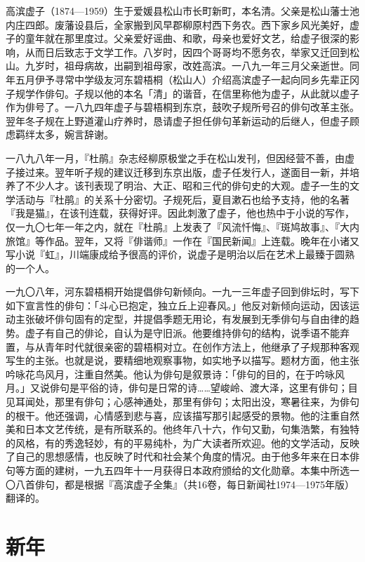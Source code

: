 {\FS
    高滨虚子（1874—1959）生于爱媛县松山市长町新町，本名清。父亲是松山藩士池内庄四郎。废藩设县后，全家搬到风早郡柳原村西下务农。西下家乡风光美好，虚子的童年就在那里度过。父亲爱好谣曲、和歌，母亲也爱好文艺，给虚子很深的影响，从而日后致志于文学工作。八岁时，因四个哥哥均不愿务农，举家又迁回到松山。九岁时，祖母病故，出嗣到祖母家，改姓高滨。一八九一年三月父亲逝世。同年五月伊予寻常中学级友河东碧梧桐（松山人）介绍高滨虚子一起向同乡先辈正冈子规学作俳句。子规以他的本名「清」的谐音，在信里称他为虚子，从此就以虚子作为俳号了。一八九四年虚子与碧梧桐到东京，鼓吹子规所号召的俳句改革主张。翌年冬子规在上野道灌山疗养时，恳请虚子担任俳句革新运动的后继人，但虚子顾虑羁绊太多，婉言辞谢。

    一八九八年一月，『杜鹃』杂志经柳原极堂之手在松山发刊，但因经营不善，由虚子接过来。翌年听子规的建议迁移到东京出版，虚子任发行人，遂面目一新，并培养了不少人才。该刊表现了明治、大正、昭和三代的俳句史的大观。虚子一生的文学活动与『杜鹃』的关系十分密切。子规死后，夏目漱石也给予支持，他的名著『我是猫』，在该刊连载，获得好评。因此刺激了虚子，他也热中于小说的写作，仅一九〇七年一年之内，就在『杜鹃』上发表了『风流忏悔』、『斑鸠故事』、『大内旅馆』等作品。翌年，又将『俳谐师』一作在『国民新闻』上连载。晚年在小诸又写小说『虹』，川端康成给予很高的评价，说虚子是明治以后在艺术上最臻于圆熟的一个人。

    一九〇八年，河东碧梧桐开始提倡俳句新倾向。一九一三年虚子回到俳坛时，写下如下宣言性的俳句：「斗心已抱定，独立丘上迎春风。」他反对新倾向运动，因该运动主张破坏俳句固有的定型，并提倡季题无用论，有发展到无季俳句与自由律的趋势。虚子有自己的俳论，自认为是守旧派。他要维持俳句的结构，说季语不能弃置，与从青年时代就很亲密的碧梧桐对立。在创作方法上，他继承了子规那种客观写生的主张。也就是说，要精细地观察事物，如实地予以描写。题材方面，他主张吟咏花鸟风月，注重自然美。他认为俳句是叙景诗：「俳句的目的，在于吟咏风月。」又说俳句是平俗的诗，俳句是日常的诗……望峻岭、渡大泽，这里有俳句；目见耳闻处，那里有俳句；心感神通处，那里有俳句；太阳出没，寒暑往来，为俳句的根干。他还强调，心情感到悲与喜，应该描写那引起感受的景物。他的注重自然美和日本文艺传统，是有所联系的。他终年八十六，作句又勤，句集浩繁，有独特的风格，有的秀逸轻妙，有的平易纯朴，为广大读者所欢迎。他的文学活动，反映了自己的思想感情，也反映了时代和社会某个角度的情况。由于他多年来在日本俳句等方面的建树，一九五四年十一月获得日本政府颁给的文化勋章。本集中所选一〇八首俳句，都是根据『高滨虚子全集』（共16卷，每日新闻社1974—1975年版）翻译的。
}

\newpage

\section{\FK 新年}

